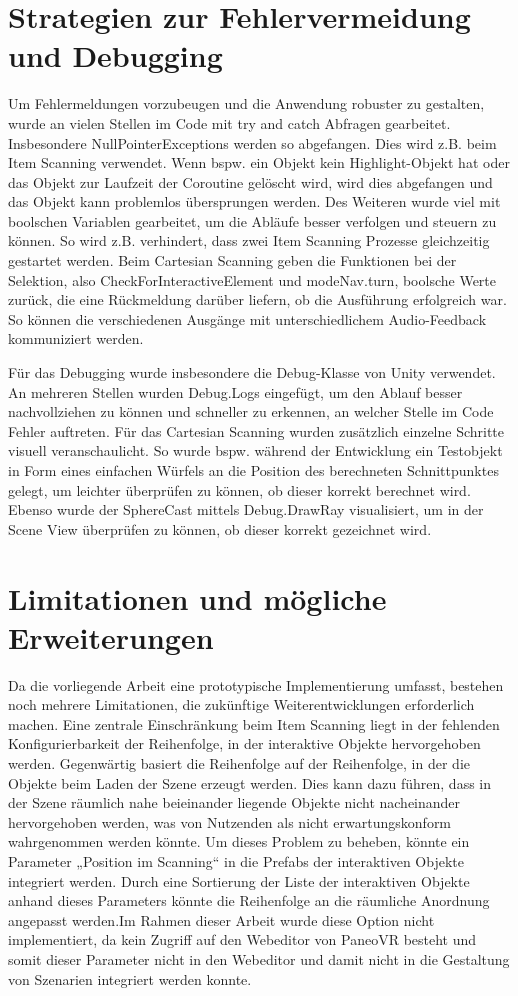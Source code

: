 \section{Strategien zur Fehlervermeidung und Debugging}

Um Fehlermeldungen vorzubeugen und die Anwendung robuster zu gestalten, wurde an vielen Stellen im Code mit try and catch Abfragen gearbeitet. Insbesondere NullPointerExceptions werden so abgefangen. Dies wird z.B. beim Item Scanning verwendet. Wenn bspw. ein Objekt kein Highlight-Objekt hat oder das Objekt zur Laufzeit der Coroutine gelöscht wird, wird dies abgefangen und das Objekt kann problemlos übersprungen werden. Des Weiteren wurde viel mit boolschen Variablen gearbeitet, um die Abläufe besser verfolgen und steuern zu können. So wird z.B. verhindert, dass zwei Item Scanning Prozesse gleichzeitig gestartet werden. Beim Cartesian Scanning geben die Funktionen bei der Selektion, also CheckForInteractiveElement und modeNav.turn, boolsche Werte zurück, die eine Rückmeldung darüber liefern, ob die Ausführung erfolgreich war. So können die verschiedenen Ausgänge mit unterschiedlichem Audio-Feedback kommuniziert werden. 

Für das Debugging wurde insbesondere die Debug-Klasse von Unity verwendet. An mehreren Stellen wurden Debug.Logs eingefügt, um den Ablauf besser nachvollziehen zu können und schneller zu erkennen, an welcher Stelle im Code Fehler auftreten. Für das Cartesian Scanning wurden zusätzlich einzelne Schritte visuell veranschaulicht. So wurde bspw. während der Entwicklung ein Testobjekt in Form eines einfachen Würfels an die Position des berechneten Schnittpunktes gelegt, um leichter überprüfen zu können, ob dieser korrekt berechnet wird. Ebenso wurde der SphereCast mittels Debug.DrawRay visualisiert, um in der Scene View überprüfen zu können, ob dieser korrekt gezeichnet wird.


\section{Limitationen und mögliche Erweiterungen}

Da die vorliegende Arbeit eine prototypische Implementierung umfasst, bestehen noch mehrere Limitationen, die zukünftige Weiterentwicklungen erforderlich machen.
Eine zentrale Einschränkung beim Item Scanning liegt in der fehlenden Konfigurierbarkeit der Reihenfolge, in der interaktive Objekte hervorgehoben werden. Gegenwärtig basiert die Reihenfolge auf der Reihenfolge, in der die Objekte beim Laden der Szene erzeugt werden. Dies kann dazu führen, dass in der Szene räumlich nahe beieinander liegende Objekte nicht nacheinander hervorgehoben werden, was von Nutzenden als nicht erwartungskonform wahrgenommen werden könnte. Um dieses Problem zu beheben, könnte ein Parameter „Position im Scanning“ in die Prefabs der interaktiven Objekte integriert werden. Durch eine Sortierung der Liste der interaktiven Objekte anhand dieses Parameters könnte die Reihenfolge an die räumliche Anordnung angepasst werden.Im Rahmen dieser Arbeit wurde diese Option nicht implementiert, da kein Zugriff auf den Webeditor von PaneoVR besteht und somit dieser Parameter nicht in den Webeditor und damit nicht in die Gestaltung von Szenarien integriert werden konnte. 

